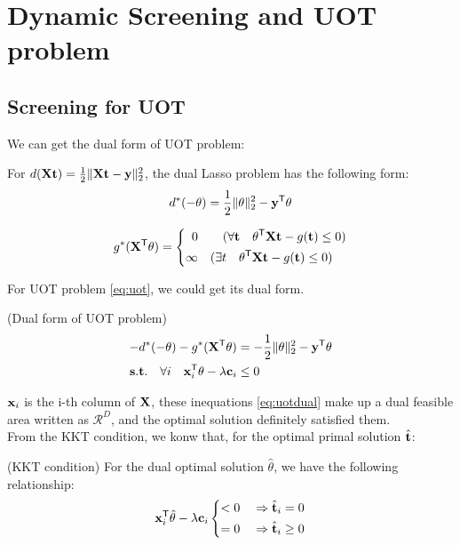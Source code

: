 \section{Dynamic Screening and UOT problem}
\subsection{Screening for UOT}

We can get the dual form of UOT problem: 
\begin{lem}
For $d(\mathbf{X} \mathbf t) = \frac{1}{2}\|\mathbf{X} \mathbf t-\mathbf y\|_2^2$, the dual Lasso problem has the following form:
$$
\begin{aligned}
d^*(-\theta) = \frac{1}{2}\|\theta\|_2^2-\mathbf y^{\mathsf T}\theta
\end{aligned}
$$

$$
g^*(\mathbf{X}^{\mathsf T}\theta) = \left\{
\begin{aligned}
0 \quad&\quad ( \forall \mathbf t \quad\theta^{\mathsf T}\mathbf{X}\mathbf t - g(\mathbf t) \leq 0 )\\
\infty \quad&( \exists t \quad\theta^{\mathsf T}\mathbf{X}\mathbf t - g(\mathbf t) \leq 0 )
\end{aligned}
\right.
$$
\end{lem}


For UOT problem \ref{eq:uot}, we could get its dual form. 
\begin{lem}(Dual form of UOT problem)
\begin{equation}
\begin{split}
-d^*(-\theta) - g^*(\mathbf{X}^{\mathsf T}\theta)& = -\frac{1}{2}\|\theta\|_2^2-\mathbf y^{\mathsf T}\theta \\
 \mathbf{s.t.} \quad \forall i \quad \mathbf{x}_i^{\mathsf T}\theta -\lambda \mathbf c_i &\leq 0
 \end{split}
 \label{eq:uotdual}
\end{equation}
\end{lem}
$\mathbf{x}_i $ is the i-th column of $\mathbf{X}$, these inequations \ref{eq:uotdual} make up a dual feasible area written as $\mathcal{R}^{D}$, and the optimal solution definitely satisfied them.\\
From the KKT condition, we konw that, for the optimal primal solution $\hat{\mathbf t}$:
\begin{thm} (KKT condition) For the dual optimal solution $\hat{\theta}$, we have the following relationship:
 \begin{equation}
\begin{split}
\mathbf{x}_i^{\mathsf T}\hat{\theta} -\lambda \mathbf c_i  \left\{
\begin{aligned}
< 0 \quad& \Rightarrow \hat{\mathbf t}_i = 0\\
= 0 \quad& \Rightarrow \hat{\mathbf t}_i \geq 0
\end{aligned}
\right.
 \end{split}
 \label{eq:kkt}
\end{equation}
\end{thm}

